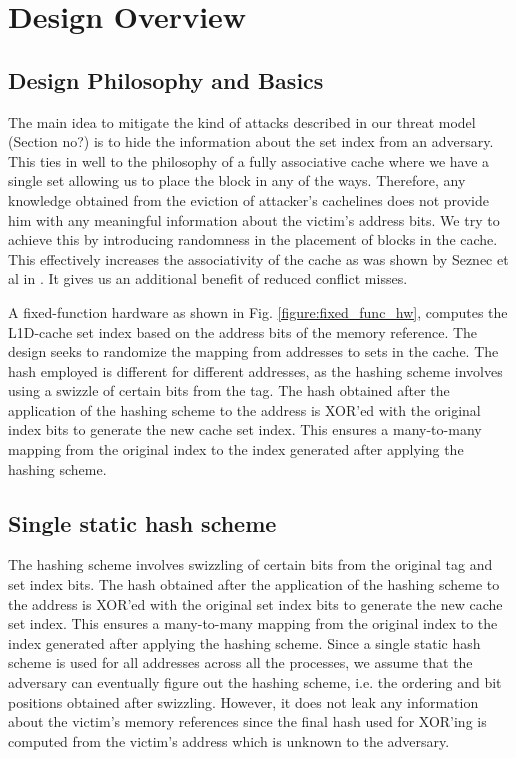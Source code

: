\section{Design Overview}
\subsection{Design Philosophy and Basics}
The main idea to mitigate the kind of attacks described in our threat model (Section no?) is to hide the information about the set index from an adversary. This ties in well to the philosophy of a fully associative cache where we have a single set allowing us to place the block in any of the ways. Therefore, any knowledge obtained from the eviction of attacker's cachelines does not provide him with any meaningful information about the victim's address bits. We try to achieve this by introducing randomness in the placement of blocks in the cache. This effectively increases the associativity of the cache as was shown by Seznec et al in \cite{skewed cache}. It gives us an additional benefit of reduced conflict misses.

A fixed-function hardware as shown in Fig. \ref{figure:fixed_func_hw}, computes the L1D-cache set index based on the address bits of the memory reference. The design seeks to randomize the mapping from addresses to sets in the cache.  The hash employed is different for different addresses, as the hashing scheme involves using a swizzle of certain bits from the tag. The hash obtained after the application of the hashing scheme to the address is XOR'ed with the original index bits to generate the new cache set index. This ensures a many-to-many mapping from the original index to the index generated after applying the hashing scheme. 

\subsection{Single static hash scheme}
The hashing scheme involves swizzling of certain bits from the original tag and set index bits. The hash obtained after the application of the hashing scheme to the address is XOR'ed with the original set index bits to generate the new cache set index. This ensures a many-to-many mapping from the original index to the index generated after applying the hashing scheme. Since a single static hash scheme is used for all addresses across all the processes, we assume that the adversary can eventually figure out the hashing scheme, i.e. the ordering and bit positions obtained after swizzling. However, it does not leak any information about the victim's memory references since the final hash used for XOR'ing is computed from the victim's address which is unknown to the adversary.

